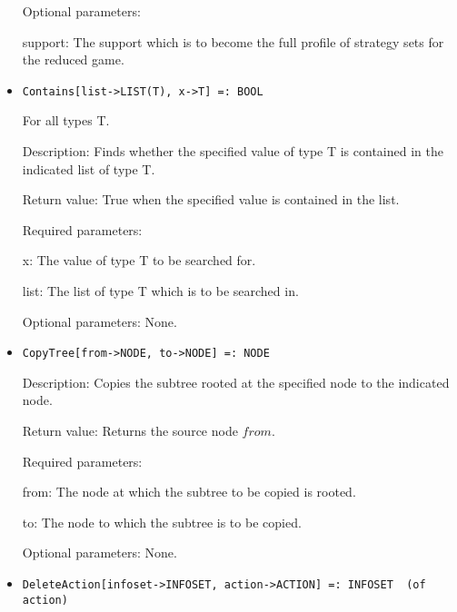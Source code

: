 \begin{itemize}
\item  
[Optional parameters:]\hfill\null
\bd
\item
[support:] The support which is to become the full profile of strategy
sets for the reduced game.   
\ed
\ed

\item
\protect \large \begin{verbatim}
Contains[list->LIST(T), x->T] =: BOOL
\end{verbatim}\normalsize

For all types T.

\bd
\item[Description:] Finds whether the specified value of type T is
contained in the indicated list of type T.
\item[Return value:] True when the specified value is contained in the
list.

\item[Required parameters:]\hfil\null
	
\bd
\item	
[x:] The value of type T to be searched for.
\item
[list:] The list of type T which is to be searched in.
\ed

\item
[Optional parameters:] None.
\ed


\item
\protect \large \begin{verbatim}
CopyTree[from->NODE, to->NODE] =: NODE
\end{verbatim}\normalsize

\bd
\item
[Description:] Copies the subtree rooted at the specified node to the
indicated node.
\item
[Return value:] Returns the source node $from$.
\item
[Required parameters:]\hfil\null

\bd
\item	
[from:] The node at which the subtree to be copied is rooted.
\item
[to:] The node to which the subtree is to be copied.
\ed

\item
[Optional parameters:] None.
\ed


\item
\protect \large \begin{verbatim}
DeleteAction[infoset->INFOSET, action->ACTION] =: INFOSET  (of action)
\end{verbatim}\normalsize


\end{itemize}

